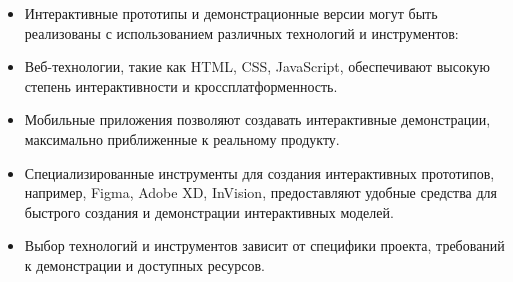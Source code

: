 \begin{enumerate}
\begin{itemize}
                \item Интерактивные прототипы и демонстрационные версии могут быть реализованы с использованием различных технологий и инструментов:
                \item Веб-технологии, такие как HTML, CSS, JavaScript, обеспечивают высокую степень интерактивности и кроссплатформенность.
                \item Мобильные приложения позволяют создавать интерактивные демонстрации, максимально приближенные к реальному продукту.
                \item Специализированные инструменты для создания интерактивных прототипов, например, Figma, Adobe XD, InVision, предоставляют удобные средства для быстрого создания и демонстрации интерактивных моделей.
                \item Выбор технологий и инструментов зависит от специфики проекта, требований к демонстрации и доступных ресурсов.
            \end{itemize}
    \end{enumerate}

